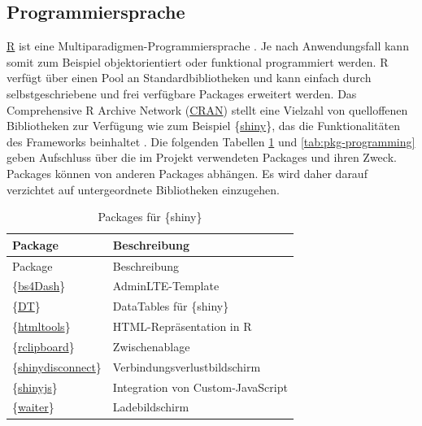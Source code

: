 \documentclass[
]{article}
\begin{document}
\hypertarget{programmiersprache}{%
\subsection{Programmiersprache}\label{programmiersprache}}

\href{https://www.r-project.org/}{R} ist eine Multiparadigmen-Programmiersprache \autocite{r-multiparadima}. Je nach Anwendungsfall kann somit zum Beispiel objektorientiert oder funktional programmiert werden. R verfügt über einen Pool an Standardbibliotheken und kann einfach durch selbstgeschriebene und frei verfügbare Packages erweitert werden. Das Comprehensive R Archive Network (\href{https://cran.r-project.org/}{CRAN}) stellt eine Vielzahl von quelloffenen Bibliotheken zur Verfügung wie zum Beispiel \{\href{https://shiny.rstudio.com/}{shiny}\}, das die Funktionalitäten des Frameworks beinhaltet \autocite{cran}. Die folgenden Tabellen \ref{tab:pkg-shiny} und \ref{tab:pkg-programming} geben Aufschluss über die im Projekt verwendeten Packages und ihren Zweck. Packages können von anderen Packages abhängen. Es wird daher darauf verzichtet auf untergeordnete Bibliotheken einzugehen.

\begin{longtable}[]{@{}ll@{}}
\caption{\label{tab:pkg-shiny} Packages für \{shiny\}}\tabularnewline
\toprule
Package & Beschreibung \\
\midrule
\endfirsthead
\toprule
Package & Beschreibung \\
\midrule
\endhead
\{\href{https://cran.r-project.org/web/packages/bs4Dash/index.html}{bs4Dash}\} \autocite{R-bs4Dash} & AdminLTE-Template \\
\{\href{https://cran.r-project.org/web/packages/DT/index.html}{DT}\} \autocite{R-DT} & DataTables für \{shiny\} \\
\{\href{https://cran.r-project.org/web/packages/htmltools/index.html}{htmltools}\} \autocite{R-htmltools} & HTML-Repräsentation in R \\
\{\href{https://cran.r-project.org/web/packages/rclipboard/index.html}{rclipboard}\} \autocite{R-rclipboard} & Zwischenablage \\
\{\href{https://cran.r-project.org/web/packages/shinydisconnect/index.html}{shinydisconnect}\} \autocite{R-shinydisconnect} & Verbindungsverlustbildschirm \\
\{\href{https://cran.r-project.org/web/packages/shinyjs/index.html}{shinyjs}\} \autocite{R-shinyjs} & Integration von Custom-JavaScript \\
\{\href{https://cran.r-project.org/web/packages/waiter/index.html}{waiter}\} \autocite{R-waiter} & Ladebildschirm \\
\bottomrule
\end{longtable}
\end{document}
